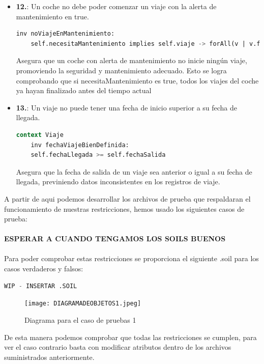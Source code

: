 \documentclass[12pt.a4paper]{article}
\begin{document}
\begin{itemize}
    \item \textbf{12.}: Un coche no debe poder comenzar un viaje con la alerta de mantenimiento en true.
    \begin{lstlisting}[style = useEspecifico,language=SQL]
    inv noViajeEnMantenimiento:
    self.necesitaMantenimiento implies self.viaje -> forAll(v | v.fechaLlegada < self.clock.NOW)   
    \end{lstlisting}
    Asegura que un coche con alerta de mantenimiento no inicie ningún viaje, promoviendo la seguridad y mantenimiento adecuado.
    Esto se logra comprobando que si necesitaMantenimiento es true, todos los viajes del coche ya hayan finalizado antes del tiempo actual 
    
    \item \textbf{13.}: Un viaje no puede tener una fecha de inicio superior a su fecha de llegada.
    \begin{lstlisting}[style = useEspecifico,language=SQL]
context Viaje
    inv fechaViajeBienDefinida:
    self.fechaLlegada >= self.fechaSalida  
    \end{lstlisting}
    Asegura que la fecha de salida de un viaje sea anterior o igual a su fecha de llegada, previniendo datos inconsistentes en los registros de viaje.
    
\end{itemize}
\vspace{1.0 cm}
A partir de aqui podemos desarrollar los archivos de prueba que respaldaran el funcionamiento de nuestras restricciones, hemos usado los siguientes casos de prueba:\\\\
\textbf{ESPERAR A CUANDO TENGAMOS LOS SOILS BUENOS}\\\\
Para poder comprobar estas restricciones se proporciona el siguiente .soil para los casos verdaderos y falsos:

\vspace{1.0 cm}
\begin{lstlisting}[style = useNormal,language=SQL, caption={Codigo de pruebas 1}] 
WIP - INSERTAR .SOIL
\end{lstlisting}
\begin{figure}[H]
     \texttt{[image: DIAGRAMADEOBJETOS1.jpeg]}
     \caption{Diagrama para el caso de pruebas 1}
     \label{Diagrama del sistema de aviacion}
\end{figure}

De esta manera podemos comprobar que todas las restricciones se cumplen, para ver el caso contrario basta con modificar atributos dentro de los archivos suministrados anteriormente.\\\\
\end{document}
